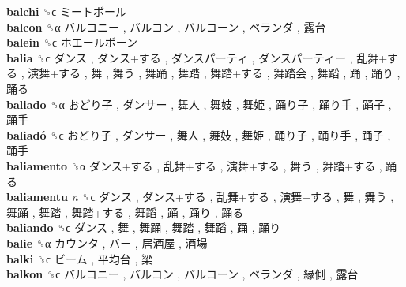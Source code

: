 \textbf{balchi} ␝ϲ   ミートボール   \\
\textbf{balcon} ␝α   バルコニー ,  バルコン ,  バルコーン ,  ベランダ ,  露台   \\
\textbf{balein} ␝ϲ   ホエールボーン   \\
\textbf{balia} ␝ϲ   ダンス ,  ダンス+する ,  ダンスパーティ ,  ダンスパーティー ,  乱舞+する ,  演舞+する ,  舞 ,  舞う ,  舞踊 ,  舞踏 ,  舞踏+する ,  舞踏会 ,  舞蹈 ,  踊 ,  踊り ,  踊る   \\
\textbf{baliado} ␝α   おどり子 ,  ダンサー ,  舞人 ,  舞妓 ,  舞姫 ,  踊り子 ,  踊り手 ,  踊子 ,  踊手   \\
\textbf{baliadó} ␝ϲ   おどり子 ,  ダンサー ,  舞人 ,  舞妓 ,  舞姫 ,  踊り子 ,  踊り手 ,  踊子 ,  踊手   \\
\textbf{baliamento} ␝α   ダンス+する ,  乱舞+する ,  演舞+する ,  舞う ,  舞踏+する ,  踊る   \\
\textbf{baliamentu} \emph{n}  ␝ϲ   ダンス ,  ダンス+する ,  乱舞+する ,  演舞+する ,  舞 ,  舞う ,  舞踊 ,  舞踏 ,  舞踏+する ,  舞蹈 ,  踊 ,  踊り ,  踊る   \\
\textbf{baliando} ␝ϲ   ダンス ,  舞 ,  舞踊 ,  舞踏 ,  舞蹈 ,  踊 ,  踊り   \\
\textbf{balie} ␝α   カウンタ ,  バー ,  居酒屋 ,  酒場   \\
\textbf{balki} ␝ϲ   ビーム ,  平均台 ,  梁   \\
\textbf{balkon} ␝ϲ   バルコニー ,  バルコン ,  バルコーン ,  ベランダ ,  縁側 ,  露台   \\
